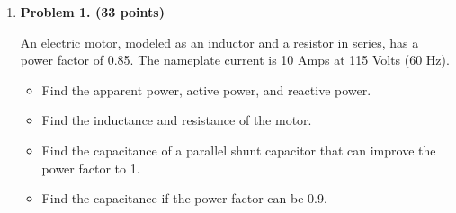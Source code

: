 \begin{enumerate}
\begin{itemize}
\end{itemize}





\item {\bf Problem 1. (33 points)} 

  An electric motor, modeled as an inductor and a resistor in series, has 
  a power factor of 0.85. The nameplate current is 10 Amps at 115 Volts 
  (60 Hz). 
  \begin{itemize}
  \item Find the apparent power, active power, and reactive power. 
  \item Find the inductance and resistance of the motor.
  \item Find the capacitance of a parallel shunt capacitor that can improve
    the power factor to 1.
  \item Find the capacitance if the power factor can be 0.9.
  \end{itemize}




\end{enumerate}
